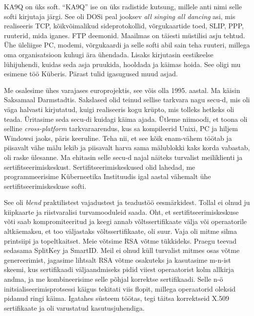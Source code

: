 
KA9Q on üks soft. \enquote{KA9Q} ise on üks radistide kutsung, millele anti nimi
selle softi kirjutaja järgi. See oli DOSi peal 
jooksev \emph{all singing all dancing} asi, mis realiseeris TCP, kõikvõimalikud 
sideprotokollid, võrgukaartide toed, SLIP, PPP, ruuterid, mida iganes. FTP 
deemonid. Maailmas on täiesti müstilisi asju tehtud. Ühe  
üleliigse PC, modemi, võrgukaardi ja selle softi abil sain teha ruuteri, 
millega oma organisatsioon kuhugi ära ühendada. Lisaks kirjutasin eestikeelse lühijuhendi, kuidas seda asja pruukida, hooldada ja 
käimas hoida. See oligi mu esimene töö Küberis. Pärast tulid igasugused muud asjad.

Me osalesime ühes varajases europrojektis, see võis olla 1995. 
aastal. Ma käisin Saksamaal Darmstadtis. Sakslased olid 
teinud sellise tarkvara nagu secu-d, mis oli väga halvasti kirjutatud, kuigi
realiseeris kogu krüpto, mis tolleks hetkeks oli teada. Üritasime seda secu-di kuidagi käima ajada. Ütleme niimoodi, et toona oli selline \emph{cross-platform} tarkvaraarendus, kus sa kompileerid Unixi, PC ja hiljem Windowsi jaoks, päris keeruline. Teha nii, et see kõik enam-vähem töötab ja piisavalt vähe mälu lekib ja piisavalt harva sama mälublokki kaks korda vabastab, oli raske ülesanne. Ma ehitasin selle secu-d najal näiteks turvalist meiliklienti ja sertifitseerimiskeskust. 
Sertifitseerimiskeskused olid lahedad, me programmeerisime Küberneetika Instituudis igal aastal vähemalt ühe 
sertifitseerimiskeskuse softi.


See oli \emph{blend} praktilistest vajadustest ja 
teadustöö eesmärkidest. Tollal ei olnud ju kiipkaarte ja 
riistvaralisi turvamooduleid saada. Oht, et 
sertifitseerimiskeskuse võti saab kompromiteeritud ja keegi annab võltssertifikaate välja või 
operaatorile altkäemaksu, et too väljastaks võltssertifikaate, oli suur. Vaja oli mitme silma printsiipi ja topeltkaitset. Meie võtsime RSA võtme tükkideks. Praegu teevad sedasama SplitKey ja SmartID. 
Meil ei olnud küll turvalist mitmes osas võtme genereerimist, jagasime lihtsalt
RSA võtme osakuteks ja kasutasime m-n-ist skeemi, kus  
sertifikaadi väljaandmiseks pidid viiest operaatorist kolm 
allkirja andma, ja me kombineerisime selle põhjal korrektse sertifikaadi. Selle 
n-ö initsialiseerimisprotsessi käigus tekitati viis flopit, millega operaatorid oleksid pidanud ringi käima. Igatahes süsteem 
töötas, tegi täitsa korrektseid X.509 sertifikaate ja oli varustatud kasutusjuhendiga.  
 
